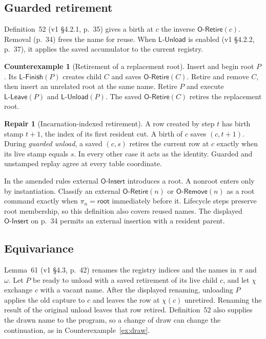 \documentclass[11pt,a4paper]{article}
\theoremstyle{definition}
\newtheorem{counterexample}[definition]{Counterexample}
\newtheorem{repair}[definition]{Repair}
\theoremstyle{plain}
\newcommand{\Root}{\mathsf{root}}
\newcommand{\OInsert}{\mathsf{O\text{-}Insert}}
\newcommand{\ORetire}{\mathsf{O\text{-}Retire}}
\newcommand{\ORemove}{\mathsf{O\text{-}Remove}}
\newcommand{\LFinish}{\mathsf{L\text{-}Finish}}
\newcommand{\LLeave}{\mathsf{L\text{-}Leave}}
\newcommand{\LUnload}{\mathsf{L\text{-}Unload}}
\begin{document}
\subsection{Guarded retirement}
\label{sec:incarnation}

Definition~52 (v1 \S4.2.1, p.~35) gives a birth at $c$ the inverse $\ORetire(c)$. Removal (p.~34) frees the name for reuse. When $\LUnload$ is enabled (v1 \S4.2.2, p.~37), it applies the saved accumulator to the current registry.

\begin{counterexample}[Retirement of a replacement root]
Insert and begin root $P$. Its $\LFinish(P)$ creates child $C$ and saves $\ORetire(C)$. Retire and remove $C$, then insert an unrelated root at the same name. Retire $P$ and execute $\LLeave(P)$ and $\LUnload(P)$. The saved $\ORetire(C)$ retires the replacement root.
\end{counterexample}

\begin{repair}[Incarnation-indexed retirement]
A row created by step $t$ has birth stamp $t+1$, the index of its first resident cut. A birth of $c$ saves $(c,t+1)$. During \emph{guarded unload}, a saved $(c,s)$ retires the current row at $c$ exactly when its live stamp equals $s$. In every other case it acts as the identity. Guarded and unstamped replay agree at every table coordinate.

In the amended rules external $\OInsert$ introduces a root. A nonroot enters only by instantiation. Classify an external $\ORetire(n)$ or $\ORemove(n)$ as a root command exactly when $\pi_n=\Root$ immediately before it. Lifecycle steps preserve root membership, so this definition also covers reused names. The displayed $\OInsert$ on p.~34 permits an external insertion with a resident parent.
\end{repair}

\subsection{Equivariance}
\label{sec:equivariance}

Lemma~61 (v1 \S4.3, p.~42) renames the registry indices and the names in $\pi$ and $\omega$. Let $P$ be ready to unload with a saved retirement of its live child $c$, and let $\chi$ exchange $c$ with a vacant name. After the displayed renaming, unloading $P$ applies the old capture to $c$ and leaves the row at $\chi(c)$ unretired. Renaming the result of the original unload leaves that row retired. Definition~52 also supplies the drawn name to the program, so a change of draw can change the continuation, as in Counterexample~\ref{ex:draw}.
\end{document}
